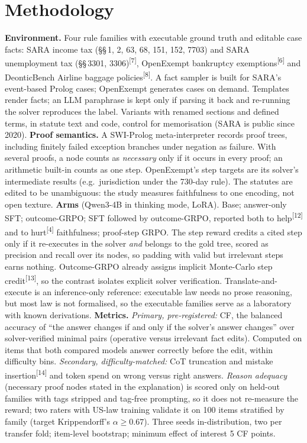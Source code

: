 \documentclass[10pt,a4paper]{article}
\newcommand{\cit}[1]{\textsuperscript{\color{muted}[#1]}}
\newcommand{\step}[1]{\textbf{\color{tum}#1}}
\begin{document}
\section{Methodology}
\step{Environment.} Four rule families with executable ground truth and editable case facts: SARA income tax (§§\,1, 2, 63, 68, 151, 152, 7703) and SARA unemployment tax (§§\,3301, 3306)\cit{7}, OpenExempt bankruptcy exemptions\cit{6} and DeonticBench Airline baggage policies\cit{8}. A fact sampler is built for SARA's event-based Prolog cases; OpenExempt generates cases on demand. Templates render facts; an LLM paraphrase is kept only if parsing it back and re-running the solver reproduces the label. Variants with renamed sections and defined terms, in statute text and code, control for memorisation (SARA is public since 2020).
\step{Proof semantics.} A SWI-Prolog meta-interpreter records proof trees, including finitely failed exception branches under negation as failure. With several proofs, a node counts as \emph{necessary} only if it occurs in every proof; an arithmetic built-in counts as one step. OpenExempt's step targets are its solver's intermediate results (e.g.\ jurisdiction under the 730-day rule). The statutes are edited to be unambiguous: the study measures faithfulness to one encoding, not open texture.
\step{Arms} (Qwen3-4B in thinking mode, LoRA). Base; answer-only SFT; outcome-GRPO; SFT followed by outcome-GRPO, reported both to help\cit{12} and to hurt\cit{4} faithfulness; proof-step GRPO. The step reward credits a cited step only if it re-executes in the solver \emph{and} belongs to the gold tree, scored as precision and recall over its nodes, so padding with valid but irrelevant steps earns nothing. Outcome-GRPO already assigns implicit Monte-Carlo step credit\cit{13}, so the contrast isolates explicit solver verification. Translate-and-execute is an inference-only reference: executable law needs no prose reasoning, but most law is not formalised, so the executable families serve as a laboratory with known derivations.
\step{Metrics.} \emph{Primary, pre-registered:} CF, the balanced accuracy of ``the answer changes if and only if the solver's answer changes'' over solver-verified minimal pairs (operative versus irrelevant fact edits). Computed on items that both compared models answer correctly before the edit, within difficulty bins. \emph{Secondary, difficulty-matched:} CoT truncation and mistake insertion\cit{14} and token spend on wrong versus right answers. \emph{Reason adequacy} (necessary proof nodes stated in the explanation) is scored only on held-out families with tags stripped and tag-free prompting, so it does not re-measure the reward; two raters with US-law training validate it on 100 items stratified by family (target Krippendorff's $\alpha \geq 0.67$). Three seeds in-distribution, two per transfer fold; item-level bootstrap; minimum effect of interest 5 CF points.
\end{document}
